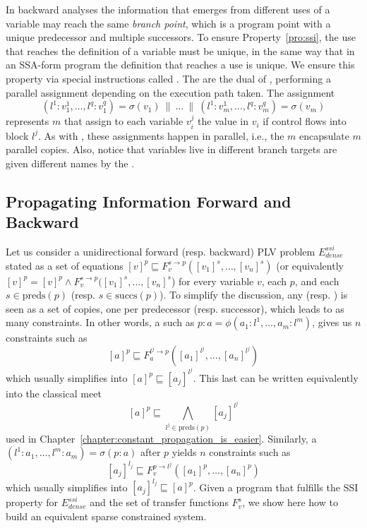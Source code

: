 {%
In backward analyses the information that emerges from different uses of a variable may reach the same {\em branch point}, which is a program point with a unique predecessor and multiple successors.
To ensure Property~\ref{pro:ssi}, the use that reaches the definition of a
variable must be unique, in the same way that in an SSA-form program the 
definition that reaches a use is unique.
We ensure this property via special instructions called \sigmafuns.
The \sigmafuns are the dual of \phifuns, performing a parallel assignment depending on the execution path taken.
The assignment \[(l^1:v_1^1, \ldots, l^q:v_1^q) = \sigma(v_1) \ \parallel\  \dots \ \parallel\  (l^1:v_m^1, \ldots, l^q:v_m^q) = \sigma(v_m)\] represents $m$ \sigmafuns that assign to each variable $v_i^j$ the value in $v_i$ if control flows into block $l^j$.
As with \phifuns, these assignments happen in parallel, i.e., the $m$ \sigmafuns encapsulate $m$ parallel copies.
Also, notice that variables live in different branch targets are given
different names by the \sigmafun.

\subsection{Propagating Information Forward and Backward}
\label{sec:ssi:pereira:engine}

Let us consider a unidirectional forward (resp. backward) PLV problem 
$E^{\textit{ssi}}_{\textit{dense}}$ stated as a set of equations $[v]^p 
\sqsubseteq  F_v^{s\to p}([v_1]^s, \dots, [v_n]^s)$ (or equivalently $[v]^p 
= [v]^p \wedge    F_v^{s\to p}([v_1]^s, \dots, [v_n]^s$) for every variable 
$v$, each \progpoint $p$, and each $s \in \textrm{preds}(p)$ (resp. $s \in 
\textrm{succs}(p)$).  To simplify the discussion, any \phifun (resp. \sigmafun) 
is seen as a set of copies, one per predecessor (resp. successor), which leads 
to as many constraints.
In other words, a \phifun such as $p:a=\phi(a_1:l^1,\dots,a_m:l^m)$, gives us 
$n$ constraints such as
$$[a]^p \sqsubseteq  F_a^{l^j\to p}([a_1]^{l^j}, \dots, [a_n]^{l^j})$$
which usually simplifies into $[a]^p \sqsubseteq [a_j]^{l^j}$.
%
This last can be written equivalently into the classical meet
$$[a]^p \sqsubseteq \bigwedge_{l^j \in \textrm{preds}(p)} [a_j]^{l^j}$$
used in Chapter~\ref{chapter:constant_propagation_is_easier}.
Similarly, a \sigmafun $(l^1:a_1,\dots,l^m:a_m)=\sigma(p:a)$ after \progpoint 
$p$ yields $n$ constraints such as
$$[a_j]^{l_j} \sqsubseteq  F_v^{p\to l^j}([a_1]^p, \dots, [a_n]^p)$$
which usually simplifies into $[a_j]^{l_j} \sqsubseteq [a]^p$.
Given a program that fulfills the SSI property for $E^{\textit{ssi}}_{\textit{dense}}$ and the set of transfer functions $F_v^s$, we show here how to build an equivalent sparse constrained system.  

}
